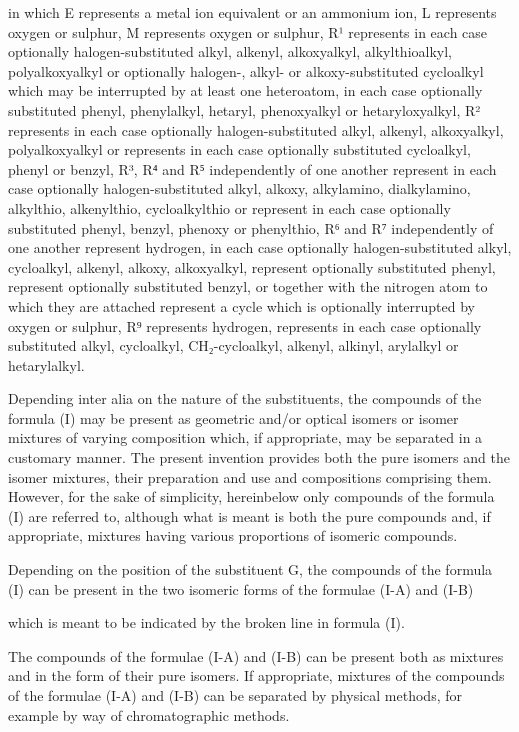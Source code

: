 \documentclass[11pt,a4paper]{article}
\begin{document}
in which E represents a metal ion equivalent or an ammonium ion, L represents oxygen or sulphur, M represents oxygen or sulphur, R¹ represents in each case optionally halogen-substituted alkyl, alkenyl, alkoxyalkyl, alkylthioalkyl, polyalkoxyalkyl or optionally halogen-, alkyl- or alkoxy-substituted cycloalkyl which may be interrupted by at least one heteroatom, in each case optionally substituted phenyl, phenylalkyl, hetaryl, phenoxyalkyl or hetaryloxyalkyl, R² represents in each case optionally halogen-substituted alkyl, alkenyl, alkoxyalkyl, polyalkoxyalkyl or represents in each case optionally substituted cycloalkyl, phenyl or benzyl, R³, R⁴ and R⁵ independently of one another represent in each case optionally halogen-substituted alkyl, alkoxy, alkylamino, dialkylamino, alkylthio, alkenylthio, cycloalkylthio or represent in each case optionally substituted phenyl, benzyl, phenoxy or phenylthio, R⁶ and R⁷ independently of one another represent hydrogen, in each case optionally halogen-substituted alkyl, cycloalkyl, alkenyl, alkoxy, alkoxyalkyl, represent optionally substituted phenyl, represent optionally substituted benzyl, or together with the nitrogen atom to which they are attached represent a cycle which is optionally interrupted by oxygen or sulphur, R⁹ represents hydrogen, represents in each case optionally substituted alkyl, cycloalkyl, CH₂-cycloalkyl, alkenyl, alkinyl, arylalkyl or hetarylalkyl.

Depending inter alia on the nature of the substituents, the compounds of the formula (I) may be present as geometric and/or optical isomers or isomer mixtures of varying composition which, if appropriate, may be separated in a customary manner. The present invention provides both the pure isomers and the isomer mixtures, their preparation and use and compositions comprising them. However, for the sake of simplicity, hereinbelow only compounds of the formula (I) are referred to, although what is meant is both the pure compounds and, if appropriate, mixtures having various proportions of isomeric compounds.

Depending on the position of the substituent G, the compounds of the formula (I) can be present in the two isomeric forms of the formulae (I-A) and (I-B)

which is meant to be indicated by the broken line in formula (I).

The compounds of the formulae (I-A) and (I-B) can be present both as mixtures and in the form of their pure isomers. If appropriate, mixtures of the compounds of the formulae (I-A) and (I-B) can be separated by physical methods, for example by way of chromatographic methods.
\end{document}
